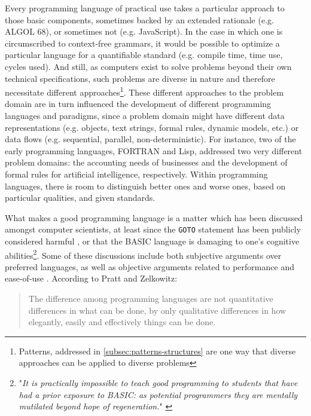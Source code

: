 Every programming language of practical use takes a particular approach to those basic components, sometimes backed by an extended rationale (e.g. ALGOL 68), or sometimes not (e.g. JavaScript). In the case in which one is circumscribed to context-free grammars, it would be possible to optimize a particular language for a quantifiable standard (e.g. compile time, time use, cycles used). And still, as computers exist to solve problems beyond their own technical specifications, such problems are diverse in nature and therefore necessitate different approaches\footnote{Patterns, addressed in \ref{subsec:patterns-structures} are one way that diverse approaches can be applied to diverse problems}. These different approaches to the problem domain are in turn influenced the development of different programming languages and paradigms, since a problem domain might have different data representations (e.g. objects, text strings, formal rules, dynamic models, etc.) or data flows (e.g. sequential, parallel, non-deterministic). For instance, two of the early programming languages, FORTRAN and Lisp, addressed two very different problem domains: the accounting needs of businesses and the development of formal rules for artificial intelligence, respectively. Within programming languages, there is room to distinguish better ones and worse ones, based on particular qualities, and given standards.

What makes a good programming language is a matter which has been discussed amongst computer scientists, at least since the \lstinline{GOTO} statement has been publicly considered harmful \citep{dijkstra_letters_1968}, or that the BASIC language is damaging to one's cognitive abilities\footnote{"\emph{It is practically impossible to teach good programming to students that have had a prior exposure to BASIC: as potential programmers they are mentally mutilated beyond hope of regeneration.}" \citep{dijkstra_how_1975}}. Some of these discussions include both subjective arguments over preferred languages, as well as objective arguments related to performance and ease-of-use \citep{gannon_impact_1975}. According to Pratt and Zelkowitz:

\begin{quote}
  The difference among programming languages are not quantitative differences in what can be done, by only qualitative differences in how elegantly, easily and effectively things can be done. \citep{pratt_programming_2000}
\end{quote}

